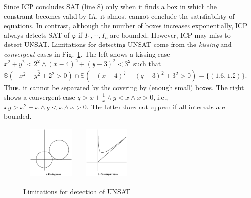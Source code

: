 \documentclass[runningheads,a4paper,oribibl]{llncs}
\begin{document}
Since ICP concludes SAT (line 8) only when it finds a box in which the constraint
becomes valid by IA, it almost cannot conclude the satisfiability of equations. 
In contrast, although the number of boxes increases exponentially,
ICP always detects SAT of 
$\varphi$
if $I_1, \cdots, I_n$ are bounded. 
However, ICP may miss to detect UNSAT.
Limitations for detecting UNSAT come from the \emph{kissing} and \emph{convergent} cases
in Fig.~\ref{fig:limit}.  The left shows a kissing case 
$x^2 + y^2 < 2^2 \wedge (x-4)^2 + (y-3)^2 < 3^2$ such that 
$\overline{\mathbb{S}(- x^2 - y^2 + 2^2 > 0)} \cap
 \overline{\mathbb{S}(- (x-4)^2 - (y-3)^2 + 3^2 > 0)} = \{(1.6, 1.2)\}$. 
Thus, it cannot be separated by the covering by (enough small) boxes. 
The right shows a convergent case 
$y > x + \frac{1}{x} \wedge y < x \wedge x > 0$,
i.e., $xy > x^2 + x \wedge y < x \wedge x > 0$.
The latter does not appear if all intervals are bounded. 
\begin{figure}[ht]
\centering
\begin{tabular}{cc}
\includegraphics[height=1in,width=1.05in]{kissing.eps} &
\includegraphics[height=1in,width=1.05in]{convergence.eps}
\end{tabular}
\caption{Limitations for detection of UNSAT} 
\label{fig:limit} 
\end{figure} 
\end{document}
